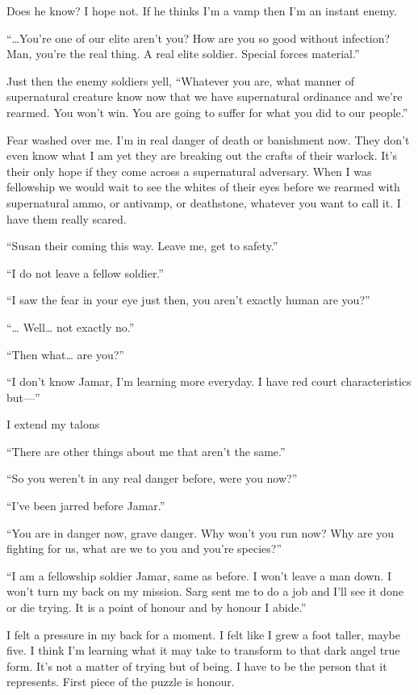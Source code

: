 Does he know? I hope not. If he thinks I'm a vamp then I'm an instant enemy.

``\dots{}You're one of our elite aren't you? How are you so good without infection? Man, you're the real thing. A real elite soldier. Special forces material.''

Just then the enemy soldiers yell, ``Whatever you are, what manner of supernatural creature know now that we have supernatural ordinance and we're rearmed. You won't win. You are going to suffer for what you did to our people.''

Fear washed over me. I'm in real danger of death or banishment now. They don't even know what I am yet they are breaking out the crafts of their warlock. It's their only hope if they come across a supernatural adversary. When I was fellowship we would wait to see the whites of their eyes before we rearmed with supernatural ammo, or antivamp, or deathstone, whatever you want to call it. I have them really scared.

``Susan their coming this way. Leave me, get to safety.''

``I do not leave a fellow soldier.''

``I saw the fear in your eye just then, you aren't exactly human are you?''

``\dots{} Well\dots{} not exactly no.''

``Then what\dots{} are you?''

``I don't know Jamar, I'm learning more everyday. I have red court characteristics but---''

I extend my talons

``There are other things about me that aren't the same.''

``So you weren't in any real danger before, were you now?''

``I've been jarred before Jamar.''

``You are in danger now, grave danger. Why won't you run now? Why are you fighting for us, what are we to you and you're species?''

``I am a fellowship soldier Jamar, same as before. I won't leave a man down. I won't turn my back on my mission. Sarg sent me to do a job and I'll see it done or die trying. It is a point of honour and by honour I abide.''

I felt a pressure in my back for a moment. I felt like I grew a foot taller, maybe five. I think I'm learning what it may take to transform to that dark angel true form. It's not a matter of trying but of being. I have to be the person that it represents. First piece of the puzzle is honour.


